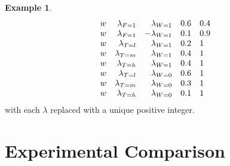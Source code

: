 \documentclass{article}
\theoremstyle{definition}
\newtheorem{example}{Example}
\theoremstyle{remark}
\begin{document}
\begin{example}
\[\begin{array}{l r r l l}
      w &\lambda\sb{F=1} &\lambda\sb{W=1} &0.6 &0.4 \\
      w &\lambda\sb{F=1} &-\lambda\sb{W=1} &0.1 &0.9 \\
      w &\lambda\sb{T=l} &\lambda\sb{W=1} &0.2 &1 \\
      w &\lambda\sb{T=m} &\lambda\sb{W=1} &0.4 &1 \\
      w &\lambda\sb{T=h} &\lambda\sb{W=1} &0.4 &1 \\
      w &\lambda\sb{T=l} &\lambda\sb{W=0} &0.6 &1 \\
      w &\lambda\sb{T=m} &\lambda\sb{W=0} &0.3 &1 \\
      w &\lambda\sb{T=h} &\lambda\sb{W=0} &0.1 &1
    \end{array}
  \]
  with each $\lambda$ replaced with a unique positive integer.
\end{example}

\section{Experimental Comparison}
\end{document}
